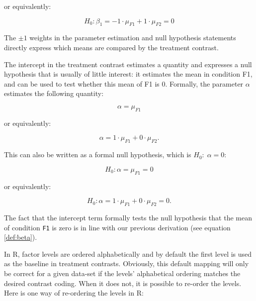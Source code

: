 \documentclass[
  12pt,
]{krantz}
\newenvironment{Shaded}{\begin{snugshade}}{\end{snugshade}}
\newcommand{\AttributeTok}[1]{\textcolor[rgb]{0.77,0.63,0.00}{#1}}
\newcommand{\FunctionTok}[1]{\textcolor[rgb]{0.00,0.00,0.00}{#1}}
\newcommand{\NormalTok}[1]{#1}
\newcommand{\OtherTok}[1]{\textcolor[rgb]{0.56,0.35,0.01}{#1}}
\newcommand{\SpecialCharTok}[1]{\textcolor[rgb]{0.00,0.00,0.00}{#1}}
\newcommand{\StringTok}[1]{\textcolor[rgb]{0.31,0.60,0.02}{#1}}
\theoremstyle{definition}
\theoremstyle{definition}
\theoremstyle{definition}
\theoremstyle{definition}
\theoremstyle{remark}
\begin{document}
or equivalently:

\begin{equation}
H_0: \beta_1 = - 1 \cdot \mu_{F1} + 1 \cdot \mu_{F2} = 0
\end{equation}

The \(\pm 1\) weights in the parameter estimation and null hypothesis statements directly express which means are compared by the treatment contrast.

The intercept in the treatment contrast estimates a quantity and expresses a null hypothesis that is usually of little interest: it estimates the mean in condition F1, and can be used to test whether this mean of F1 is \(0\).
Formally, the parameter \(\alpha\) estimates the following quantity:

\begin{equation}
\alpha = \mu_{F1}
\end{equation}

\noindent
or equivalently:

\begin{equation}
\alpha = 1 \cdot \mu_{F1} + 0 \cdot \mu_{F2} .
\end{equation}

This can also be written as a formal null hypothesis, which is \(H_0: \; \alpha = 0\):

\begin{equation}
H_0: \alpha = \mu_{F1} = 0
\end{equation}

\noindent
or equivalently:

\begin{equation} \label{eq:trmtcontrfirstmention}
H_0: \alpha = 1 \cdot \mu_{F1} + 0 \cdot \mu_{F2} = 0 .
\end{equation}

\noindent
The fact that the intercept term formally tests the null hypothesis that the mean of condition \texttt{F1} is zero is in line with our previous derivation (see equation \ref{def:beta}).

In R, factor levels are ordered alphabetically and by default the first level is used as the baseline in treatment contrasts. Obviously, this default mapping will only be correct for a given data-set if the levels' alphabetical ordering matches the desired contrast coding. When it does not, it is possible to re-order the levels. Here is one way of re-ordering the levels in R:

\begin{Shaded}
\end{Shaded}
\end{document}
